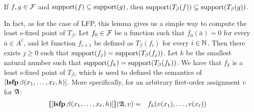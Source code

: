 \begin{lemma}\label{lem-support}
If $f,g \in \F$ and $\text{\rm support}(f) \subseteq \text{\rm support}(g)$, then $\text{\rm support}(T_\beta(f)) \subseteq \text{\rm support}(T_\beta(g))$.
\end{lemma}
In fact, as for the case of LFP, this lemma gives us a simple way to compute the least s-fixed point of $T_\beta$. Let $f_0 \in \F$ be a function such that $f_0(\bar a) = 0$ for every $\bar a \in A^\ell$, and let function $f_{i+1}$ be defined as $T_\beta(f_i)$ for every $i \in \mathbb{N}$. Then there exists $j \geq 0$ such that $\text{\rm support}(f_j) = \text{\rm support}(T_\beta(f_j))$. Let $k$ be the smallest natural number such that $\text{\rm support}(f_{k}) = \text{\rm support}(T_\beta(f_k))$. We have that $f_k$ is a least s-fixed point of $T_\beta$, which is used to defined the semantics of $[{\bf lsfp} \, \beta(x_1, \ldots, x_\ell, h)]$. More specifically, for an arbitrary first-order assignment $v$ for $\mathfrak{A}$:
\begin{eqnarray*}
{\llbracket{}{[{\bf lsfp} \, \beta(x_1, \ldots, x_\ell, h)]}\rrbracket}(\mathfrak{A},v) & = & f_{k}(v(x_1), \ldots, v(x_\ell))
\end{eqnarray*}

